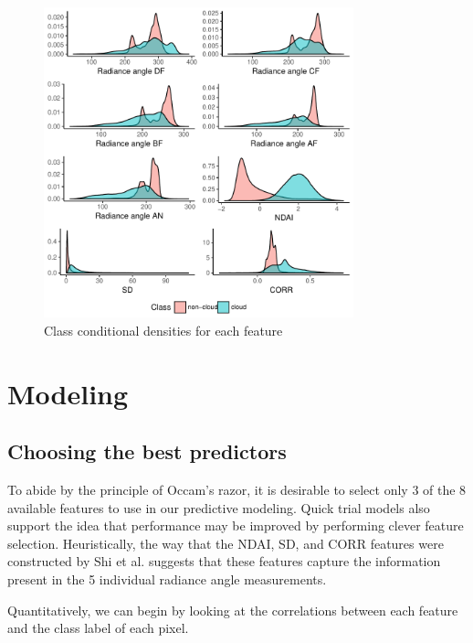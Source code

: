 \documentclass{article}\usepackage[]{graphicx}\usepackage[]{color}
\begin{document}
\begin{figure}[h!]
\begin{center}
\caption{Class conditional densities for each feature}
\includegraphics[width = 0.8\textwidth]{figures/class_densities.pdf}
\end{center}
\end{figure}

\section{Modeling}

\subsection{Choosing the best predictors}

To abide by the principle of Occam's razor, it is desirable to select only 3 of
the 8 available features to use in our predictive modeling. Quick trial models
also support the idea that performance may be improved by performing clever
feature selection. Heuristically, the way that the NDAI, SD, and CORR features
were constructed by Shi et al. suggests that these features capture the information
present in the 5 individual radiance angle measurements. 

Quantitatively, we can begin by looking at the correlations between each feature
and the class label of each pixel. 
\end{document}
